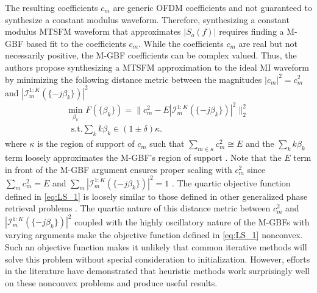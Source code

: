 \documentclass{article}
\begin{document}
The resulting coefficients $c_m$ are generic OFDM coefficients and not guaranteed to synthesize a constant modulus waveform.  Therefore, synthesizing a constant modulus MTSFM waveform that approximates $|S_o\left(f\right)|$ requires finding a M-GBF based fit to the coefficients $c_m$.  While the coefficients $c_m$ are real but not necessarily positive, the M-GBF coefficients can be complex valued.  Thus, the authors propose synthesizing a MTSFM approximation to the ideal MI waveform by minimizing the following distance metric between the magnitudes $|c_m|^2 = c_m^2$ and $|\mathcal{I}_m^{1:K}\left(\{-j\beta_k\}\right)|^2$ 
\begin{multline}
\underset{\beta_k}{\text{min}}\text{~}F\left(\{\beta_k\}\right) = \| c_m^2 - E|\mathcal{I}_m^{1:K}\left(\{-j\beta_k\}\right)|^2 \|_2^2 \\ \text{~s.t.} \sum_k k\beta_k \in \left(1\pm\delta\right)\kappa.
\label{eq:LS_1}
\end{multline}
where $\kappa$ is the region of support of $c_m$ such that $\sum_{m\in \kappa} c_m^2 \cong E$ and the $\sum_k k \beta_k$ term loosely approximates the M-GBF's region of support \cite{DattoliBook}.  Note that the $E$ term in front of the M-GBF argument ensures proper scaling with $c_m^2$ since $\sum_m c_m^2 = E$ and $\sum_m |\mathcal{I}_m^{1:K}\left(\{-j\beta_k\}\right)|^2 = 1$ \cite{DattoliBook}.  The quartic objective function defined in \eqref{eq:LS_1} is loosely similar to those defined in other generalized phase retrieval problems \cite{sun2018geometric, PR_Wirtinger}.  The quartic nature of this distance metric between $c_m^2$ and $|\mathcal{I}_m^{1:K}\left(\{-j\beta_k\}\right)|^2$ coupled with the highly oscillatory nature of the M-GBFs with varying arguments make the objective function defined in \eqref{eq:LS_1} nonconvex.  Such an objective function makes it unlikely that common iterative methods will solve this problem without special consideration to initialization.  However, efforts in the literature \cite{nonConvexPhase, PR_Optics} have demonstrated that heuristic methods work surprisingly well on these nonconvex problems and produce useful results.  
\end{document}
